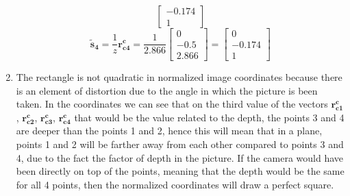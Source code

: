 \documentclass[12pt, letterpaper]{article}
\begin{document}
\begin{enumerate}
\begin{equation*}
\begin{bmatrix}
                -0.174\\
                1
            \end{bmatrix}
        \end{equation*}
        \begin{equation*}
            \bm{\tilde{s}_4}=\frac{1}{z}\bm{{r}^c_{c4}}=
            \frac{1}{2.866}
            \begin{bmatrix}
                0\\
                -0.5\\
                2.866
            \end{bmatrix}=
            \begin{bmatrix}
                0\\
                -0.174\\
                1
            \end{bmatrix}
        \end{equation*}
    \item The rectangle is not quadratic in normalized image coordinates because there
        is an element of distortion due to the angle in which the picture is been taken.
        In the coordinates we can see that on the third value of the vectors $\bm{r_{c1}^c}$, $\bm{r_{c2}^c}$, $\bm{r_{c3}^c}$, 
        $\bm{r_{c4}^c}$ that would be the value related to the depth, the points 3 and 4 are
        deeper than the points 1 and 2, hence this will mean that in a plane, points
        1 and 2 will be farther away from each other compared to points 3 and 4, due to the fact 
        the factor of depth in the picture. If the camera would have been directly on top of the points, meaning that
        the depth would be the same for all 4 points, then the normalized coordinates will draw a perfect square.
\end{enumerate}
\newpage
\end{document}
